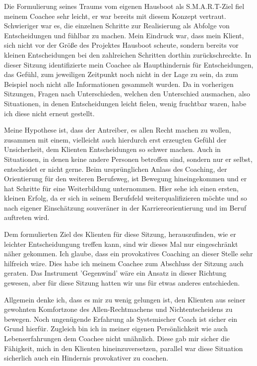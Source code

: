\documentclass[11pt,a4paper]{article}
\begin{document}
Die Formulierung seines Traums vom eigenen Hausboot als S.M.A.R.T-Ziel fiel meinem Coachee sehr leicht, er war bereits mit diesem Konzept vertraut. Schwieriger war es, die einzelnen Schritte zur Realisierung als Abfolge von Entscheidungen und fühlbar zu machen. Mein Eindruck war, dass mein Klient, sich nicht vor der Größe des Projektes Hausboot scheute, sondern bereits vor kleinen Entscheidungen bei den zahlreichen Schritten dorthin zurückschreckte. In dieser Sitzung identifizierte mein Coachee als Haupthindernis für Entscheidungen, das Gefühl, zum jeweiligen Zeitpunkt noch nicht in der Lage zu sein, da zum Beispiel noch nicht alle Informationen gesammelt wurden. Da in vorherigen Sitzungen, Fragen nach Unterschieden, welchen den Unterschied ausmachen, also Situationen, in denen Entscheidungen leicht fielen, wenig fruchtbar waren, habe ich diese nicht erneut gestellt. 

Meine Hypothese ist, dass der Antreiber, es allen Recht machen zu wollen, zusammen mit einem, vielleicht auch hierdurch erst erzeugten Gefühl der Unsicherheit, dem Klienten Entscheidungen so schwer machen. Auch in Situationen, in denen keine andere Personen betroffen sind, sondern nur er selbst, entscheidet er nicht gerne. Beim ursprünglichen Anlass des Coaching, der Orientierung für den weiteren Berufsweg, ist Bewegung hineingekommen und er hat Schritte für eine Weiterbildung unternommen. Hier sehe ich einen ersten, kleinen Erfolg, da er sich in seinem Berufsfeld weiterqualifizieren möchte und so nach eigener Einschätzung souveräner in der Karriereorientierung und im Beruf auftreten wird.

Dem formulierten Ziel des Klienten für diese Sitzung, herauszufinden, wie er leichter Entscheidungung treffen kann, sind wir dieses Mal nur eingeschränkt näher gekommen. Ich glaube, dass ein provokatives Coaching an dieser Stelle sehr hilfreich wäre. Dies habe ich meinem Coachee zum Abschluss der Sitzung auch geraten. Das Instrument 'Gegenwind' wäre ein Ansatz in dieser Richtung gewesen, aber für diese Sitzung hatten wir uns für etwas anderes entschieden.

Allgemein denke ich, dass es mir zu wenig gelungen ist, den Klienten aus seiner gewohnten Komfortzone des Allen-Rechtmachens und Nichtentscheidens zu bewegen. Noch ungenügende Erfahrung als Systemischer Coach ist sicher ein Grund hierfür. Zugleich bin ich in meiner eigenen Persönlichkeit wie auch Lebenserfahrungen dem Coachee nicht unähnlich. Diese gab mir sicher die Fähigkeit, mich in den Klienten hineinzuversetzen, parallel war diese Situation sicherlich auch ein Hindernis provokativer zu coachen.  
\end{document}

